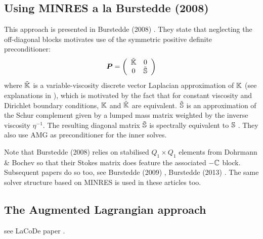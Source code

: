 \subsection{Using MINRES a la Burstedde \etal (2008)}

This approach is presented in Burstedde \etal (2008) \cite{bugg08}.
They state that neglecting the off-diagonal blocks motivates use of the symmetric
positive definite preconditioner:
\[
{\bm P} = \left(
\begin{array}{cc}
\tilde{{\mathbb{K}}} & 0 \\
0 & \tilde{{\mathbb{S}}}
\end{array}
\right)
\]
where $\tilde{{\mathbb{K}}}$ is a variable-viscosity discrete vector Laplacian
approximation of ${\mathbb{K}}$ (see explanations in \cite{bugs09}), 
which is motivated by the fact that
for constant viscosity and Dirichlet boundary conditions,
${\mathbb{K}}$ and $\tilde{{\mathbb{K}}}$ are equivalent. 
$\tilde{{\mathbb{S}}}$ is an approximation of
the Schur complement given by a lumped mass matrix
weighted by the inverse viscosity $\eta^{-1}$. The resulting
diagonal matrix $\tilde{{\mathbb{S}}}$ is spectrally equivalent to ${\mathbb{S}}$ \cite{elsw}.
They also use AMG as preconditioner for the inner solves. 

Note that Burstedde \etal  (2008) \cite{bugg08} relies on stabilised 
$Q_1\times Q_1$ elements from Dohrmann \& Bochev \cite{dobo04} 
so that their Stokes matrix does feature the associated $-{\mathbb{C}}$ block.
Subsequent papers do so too, see Burstedde \etal (2009) \cite{bugs09}, 
Burstedde \etal (2013) \cite{busa13}.
The same solver structure based on MINRES is used in these articles too.

\subsection{The Augmented Lagrangian approach}

see LaCoDe paper \cite{demh19}.

